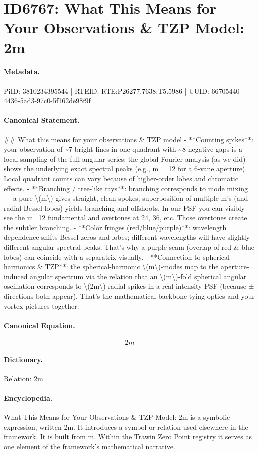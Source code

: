 \section*{ID6767: What This Means for Your Observations \& TZP Model: 2m}
\paragraph{Metadata.}
PiID: 3810234395544 | RTEID: RTE:P26277.7638:T5.5986 | UUID: 66705440-4436-5ad3-97c0-5f162de98f9f

\paragraph{Canonical Statement.}
\#\# What this means for your observations \& TZP model - **Counting spikes**: your observation of \textasciitilde{}7 bright lines in one quadrant with \textasciitilde{}8 negative gaps is a local sampling of the full angular series; the global Fourier analysis (as we did) shows the underlying exact spectral peaks (e.g., m = 12 for a 6-vane aperture). Local quadrant counts can vary because of higher-order lobes and chromatic effects. - **Branching / tree-like rays**: branching corresponds to mode mixing — a pure \textbackslash{}(m\textbackslash{}) gives straight, clean spokes; superposition of multiple m’s (and radial Bessel lobes) yields branching and offshoots. In our PSF you can visibly see the m=12 fundamental and overtones at 24, 36, etc. Those overtones create the subtler branching. - **Color fringes (red/blue/purple)**: wavelength dependence shifts Bessel zeros and lobes; different wavelengths will have slightly different angular-spectral peaks. That’s why a purple seam (overlap of red \& blue lobes) can coincide with a separatrix visually. - **Connection to spherical harmonics \& TZP**: the spherical-harmonic \textbackslash{}(m\textbackslash{})-modes map to the aperture-induced angular spectrum via the relation that an \textbackslash{}(m\textbackslash{})-fold spherical angular oscillation corresponds to \textbackslash{}(2m\textbackslash{}) radial spikes in a real intensity PSF (because ± directions both appear). That’s the mathematical backbone tying optics and your vortex pictures together.

\paragraph{Canonical Equation.}
\[
2m
\]

\paragraph{Dictionary.}
Relation: 2m

\paragraph{Encyclopedia.}
What This Means for Your Observations \& TZP Model: 2m is a symbolic expression, written 2m. It introduces a symbol or relation used elsewhere in the framework. It is built from m. Within the Trawin Zero Point registry it serves as one element of the framework's mathematical narrative.
